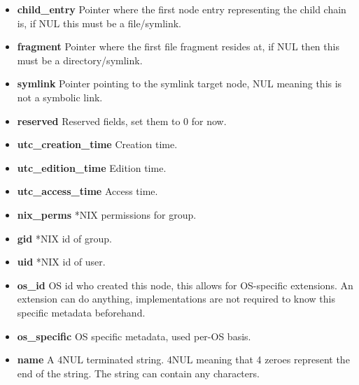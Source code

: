 \documentclass[12pt]{article}
\begin{document}
\begin{itemize}
	\item \textbf{child\_entry} Pointer where the first node entry representing the child chain is, if NUL this must be a file/symlink.
	\item \textbf{fragment} Pointer where the first file fragment resides at, if NUL then this must be a directory/symlink.
	\item \textbf{symlink} Pointer pointing to the symlink target node, NUL meaning this is not a symbolic link.
	\item \textbf{reserved} Reserved fields, set them to 0 for now.
	\item \textbf{utc\_creation\_time} Creation time.
	\item \textbf{utc\_edition\_time} Edition time.
	\item \textbf{utc\_access\_time} Access time.
	\item \textbf{nix_perms} *NIX permissions for group.
	\item \textbf{gid} *NIX id of group.
	\item \textbf{uid} *NIX id of user.
	\item \textbf{os\_id} OS id who created this node, this allows for OS-specific extensions. An extension can do anything, implementations are not required to know this specific metadata beforehand.
	\item \textbf{os\_specific} OS specific metadata, used per-OS basis.
	\item \textbf{name} A 4NUL terminated string. 4NUL meaning that 4 zeroes represent the end of the string. The string can contain any characters.
\end{itemize}
\end{document}
